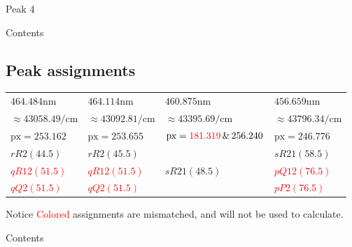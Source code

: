 \documentclass[aspectratio=43,scheme=plain]{ctexbeamer}
\begin{document}
\begin{frame}{Peak 4}
\begin{figure}[H]
\end{figure}
\end{frame}
\begin{frame}{Contents}
\end{frame}
\subsection{Peak assignments}
\begin{frame}{\insertsubsection}\nocite{pgopher}
			\begin{table}
			\centering  	 
			\scriptsize
			\begin{tabularx}{0.97\textwidth}{llll}    
				\toprule   
				$464.484 \unit{\nano \meter}$ &$464.114\unit{\nano \meter}$&$460.875 \unit{\nano \meter}$& $456.659 \unit{\nano \meter}$\\
				$\approx43058.49 \unit{\per \centi \meter}$ &   $\approx43092.81\unit{\per \centi \meter}$ &  $\approx 43395.69\unit{\per \centi \meter}$ & $\approx 43796.34\unit{\per \centi \meter} $\\
				\midrule   
				$\text{px}=253.162$ & $\text{px}=253.655$ & $\text{px}=\textcolor{red}{181.319}\,\&\,256.240$ &$ \text{px}=246.776$ \\  
				\midrule 
				$rR2\left( 44.5\right) $ & $rR2\left( 45.5\right) $ &  &$sR21\left( 58.5\right) $\\  
				\textcolor{red}{$qR12\left( 51.5\right) $} & \textcolor{red}{$qR12 \left( 51.5\right) $} &  $sR21\left( 48.5\right) $ & \textcolor{red}{$pQ12 \left( 76.5\right) $} \\ 
				\textcolor{red}{$qQ2\left(  51.5\right) $} & \textcolor{red}{$qQ2\left(  51.5\right) $} &   & \textcolor{red}{$pP2\left(  76.5\right) $} \\ 
				\bottomrule    
			\end{tabularx}%
			\label{tab:addlabel}%
		\end{table}%
		\begin{alertblock}{Notice}
			\textcolor{red}{Colored} assignments are mismatched, and will not be used to calculate.
		\end{alertblock}
	\end{frame}
	\begin{frame}{Contents}
	\end{frame}
\end{document}

